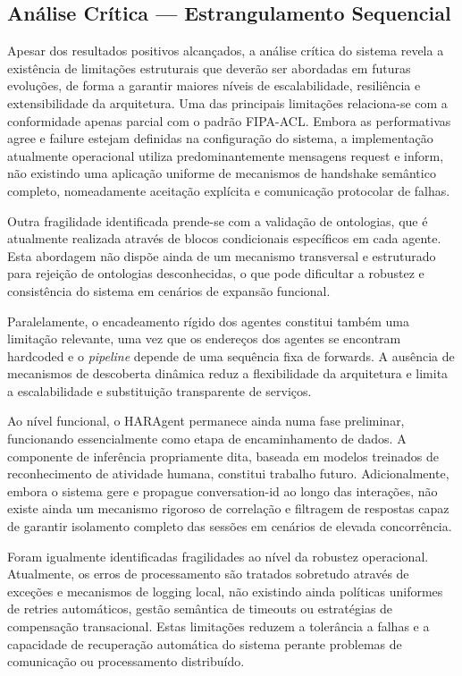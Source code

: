 \documentclass[runningheads]{llncs}
\begin{document}
\subsection{Análise Crítica — Estrangulamento Sequencial}
Apesar dos resultados positivos alcançados, a análise crítica do sistema revela a existência de limitações estruturais que deverão ser abordadas em futuras evoluções, de forma a garantir maiores níveis de escalabilidade, resiliência e extensibilidade da arquitetura. Uma das principais limitações relaciona-se com a conformidade apenas parcial com o padrão FIPA-ACL. Embora as performativas agree e failure estejam definidas na configuração do sistema, a implementação atualmente operacional utiliza predominantemente mensagens request e inform, não existindo uma aplicação uniforme de mecanismos de handshake semântico completo, nomeadamente aceitação explícita e comunicação protocolar de falhas. 

Outra fragilidade identificada prende-se com a validação de ontologias, que é atualmente realizada através de blocos condicionais específicos em cada agente. Esta abordagem não dispõe ainda de um mecanismo transversal e estruturado para rejeição de ontologias desconhecidas, o que pode dificultar a robustez e consistência do sistema em cenários de expansão funcional.  

Paralelamente, o encadeamento rígido dos agentes constitui também uma limitação relevante, uma vez que os endereços dos agentes se encontram hardcoded e o \textit{pipeline} depende de uma sequência fixa de forwards. A ausência de mecanismos de descoberta dinâmica reduz a flexibilidade da arquitetura e limita a escalabilidade e substituição transparente de serviços. 

Ao nível funcional, o HARAgent permanece ainda numa fase preliminar, funcionando essencialmente como etapa de encaminhamento de dados. A componente de inferência propriamente dita, baseada em modelos treinados de reconhecimento de atividade humana, constitui trabalho futuro. Adicionalmente, embora o sistema gere e propague conversation-id ao longo das interações, não existe ainda um mecanismo rigoroso de correlação e filtragem de respostas capaz de garantir isolamento completo das sessões em cenários de elevada concorrência. 

Foram igualmente identificadas fragilidades ao nível da robustez operacional. Atualmente, os erros de processamento são tratados sobretudo através de exceções e mecanismos de logging local, não existindo ainda políticas uniformes de retries automáticos, gestão semântica de timeouts ou estratégias de compensação transacional. Estas limitações reduzem a tolerância a falhas e a capacidade de recuperação automática do sistema perante problemas de comunicação ou processamento distribuído. 
\end{document}
